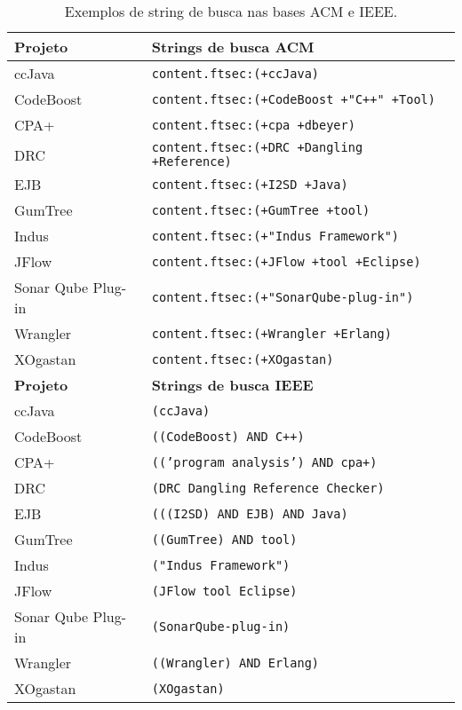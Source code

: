 \begin{table}[h]
\caption{Exemplos de string de busca nas bases ACM e IEEE.}
\centering
\begin{tabular}{l p{10cm}}
  \hline
  {\bf Projeto} & {\bf Strings de busca ACM} \\
  \hline
  ccJava & \texttt{content.ftsec:(+ccJava)} \\
  CodeBoost & \texttt{content.ftsec:(+CodeBoost +"C++" +Tool)} \\
  CPA+ & \texttt{content.ftsec:(+cpa +dbeyer)} \\
  DRC & \texttt{content.ftsec:(+DRC +Dangling +Reference)} \\
  EJB & \texttt{content.ftsec:(+I2SD +Java)} \\
  GumTree & \texttt{content.ftsec:(+GumTree +tool)} \\
  Indus & \texttt{content.ftsec:(+"Indus Framework")} \\
  JFlow & \texttt{content.ftsec:(+JFlow +tool +Eclipse)} \\
  Sonar Qube Plug-in & \texttt{content.ftsec:(+"SonarQube-plug-in")} \\
  Wrangler & \texttt{content.ftsec:(+Wrangler +Erlang)} \\
  XOgastan & \texttt{content.ftsec:(+XOgastan)} \\
  \hline
  {\bf Projeto} & {\bf Strings de busca IEEE} \\
  \hline
  ccJava & \texttt{(ccJava)} \\
  CodeBoost & \texttt{((CodeBoost) AND C++)} \\
  CPA+ & \texttt{(('program analysis') AND cpa+)} \\
  DRC & \texttt{(DRC Dangling Reference Checker)} \\
  EJB & \texttt{(((I2SD) AND EJB) AND Java)} \\
  GumTree & \texttt{((GumTree) AND tool)} \\
  Indus & \texttt{("Indus Framework")} \\
  JFlow & \texttt{(JFlow tool Eclipse)} \\
  Sonar Qube Plug-in & \texttt{(SonarQube-plug-in)} \\
  Wrangler & \texttt{((Wrangler) AND Erlang)} \\
  XOgastan & \texttt{(XOgastan)} \\
  \hline
\end{tabular}
\label{search-string-table}
\end{table}
